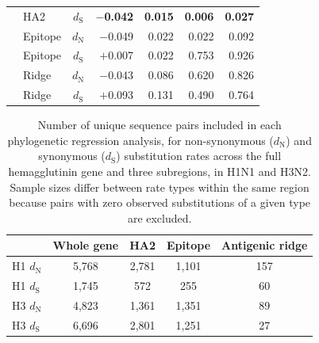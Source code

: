 \documentclass[12pt]{article}
\begin{document}
\begin{table}[H]
\begin{tabular}{llcrrrr}
                      & HA2        & $d_{\text{S}}$  & \textbf{$-$0.042} & \textbf{0.015} & \textbf{0.006}    & \textbf{0.027}    \\
                      & Epitope    & $d_{\text{N}}$ & $-$0.049          & 0.022          & 0.022             & 0.092             \\
                      & Epitope    & $d_{\text{S}}$  & $+$0.007          & 0.022          & 0.753             & 0.926             \\
                      & Ridge      & $d_{\text{N}}$ & $-$0.043          & 0.086          & 0.620             & 0.826             \\
                      & Ridge      & $d_{\text{S}}$  & $+$0.093          & 0.131          & 0.490             & 0.764             \\
        \bottomrule
    \end{tabular}
\end{table}
\newpage

\begin{table}[H]
    \centering
    \caption{Number of unique sequence pairs included in each phylogenetic regression analysis, for non-synonymous ($d_{\text{N}}$) and synonymous ($d_{\text{S}}$) substitution rates across the full hemagglutinin gene and three subregions, in H1N1 and H3N2. Sample sizes differ between rate types within the same region because pairs with zero observed substitutions of a given type are excluded.}
    \label{tab:s2_epitope}
    \begin{tabular}{lcccc}
        \toprule
        & \textbf{Whole gene} & \textbf{HA2} & \textbf{Epitope} & \textbf{Antigenic ridge} \\
        \midrule
        H1 $d_{\text{N}}$ & 5{,}768 & 2{,}781 & 1{,}101 & 157 \\
        H1 $d_{\text{S}}$  & 1{,}745 &   572 &   255 &  60 \\
        H3 $d_{\text{N}}$ & 4{,}823 & 1{,}361 & 1{,}351 &  89 \\
        H3 $d_{\text{S}}$  & 6{,}696 & 2{,}801 & 1{,}251 &  27 \\
        \bottomrule
    \end{tabular}
\end{table}
\newpage
\end{document}
